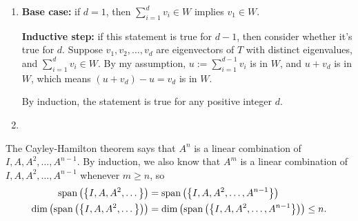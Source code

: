\documentclass{article}
\begin{document}
\bigskip
\par
\begin{prob}
\end{prob}
\begin{enumerate}[label=(\alph*)]
    \item \textbf{Base case:} if $d=1$, then $\sum_{i=1}^d v_i \in W$ implies $v_1 \in W$.
        \par
        \textbf{Inductive step:} if this statement is true for $d-1$, then consider whether it's true for $d$. Suppose $v_1, v_2, \dots, v_d$ are eigenvectors of $T$ with distinct eigenvalues, and $\sum_{i=1}^d v_i \in W$. By my assumption, $u := \sum_{i=1}^{d-1} v_i$ is in $W$, and $u+v_d$ is in $W$, which means $(u+v_d)-u=v_d$ is in $W$.
        \par
        By induction, the statement is true for any positive integer $d$.
    \item
\end{enumerate}

\bigskip
\par
\begin{prob}
\end{prob}

\bigskip
\par
\begin{prob}
\end{prob}
The Cayley-Hamilton theorem says that $A^n$ is a linear combination of $I, A, A^2, \dots, A^{n-1}$. By induction, we also know that $A^m$ is a linear combination of $I, A, A^2, \dots, A^{n-1}$ whenever $m \geq n$, so
\begin{align*}
    \operatorname{span} \left( \left\{ I, A, A^2, \dots \right\} \right) &= \operatorname{span} \left( \left\{ I, A, A^2, \dots, A^{n-1} \right\} \right) \\
    \dim \left( \operatorname{span} \left( \left\{ I, A, A^2, \dots \right\} \right) \right) &= \dim \left( \operatorname{span} \left( \left\{ I, A, A^2, \dots, A^{n-1} \right\} \right) \right) \leq n.
\end{align*}


\end{document}
